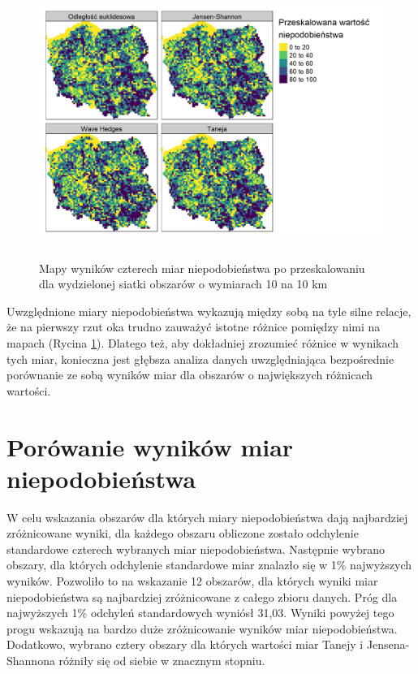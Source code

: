 \documentclass{amuthesis}
\begin{document}
\begin{figure}[t]

{\centering \includegraphics[width=5.20833in,height=3.46875in]{figures/zestawienie_miar1.png}

}

\caption{\label{fig-zestawienie_miar1}Mapy wyników czterech miar
niepodobieństwa po przeskalowaniu dla wydzielonej siatki obszarów o
wymiarach 10 na 10 km}

\end{figure}

Uwzględnione miary niepodobieństwa wykazują między sobą na tyle silne
relacje, że na pierwszy rzut oka trudno zauważyć istotne różnice
pomiędzy nimi na mapach (Rycina \ref{fig-zestawienie_miar1}). Dlatego
też, aby dokładniej zrozumieć różnice w wynikach tych miar, konieczna
jest głębsza analiza danych uwzględniająca bezpośrednie porównanie ze
sobą wyników miar dla obszarów o największych różnicach wartości.

\hypertarget{poruxf3wanie-wynikuxf3w-miar-niepodobieux144stwa}{%
\section{Porówanie wyników miar
niepodobieństwa}\label{poruxf3wanie-wynikuxf3w-miar-niepodobieux144stwa}}

W celu wskazania obszarów dla których miary niepodobieństwa dają
najbardziej zróżnicowane wyniki, dla każdego obszaru obliczone zostało
odchylenie standardowe czterech wybranych miar niepodobieństwa.
Następnie wybrano obszary, dla których odchylenie standardowe miar
znalazło się w 1\% najwyższych wyników. Pozwoliło to na wskazanie 12
obszarów, dla których wyniki miar niepodobieństwa są najbardziej
zróżnicowane z całego zbioru danych. Próg dla najwyższych 1\% odchyleń
standardowych wyniósł 31,03. Wyniki powyżej tego progu wskazują na
bardzo duże zróżnicowanie wyników miar niepodobieństwa. Dodatkowo,
wybrano cztery obszary dla których wartości miar Tanejy i
Jensena-Shannona różniły się od siebie w znacznym stopniu.
\end{document}
